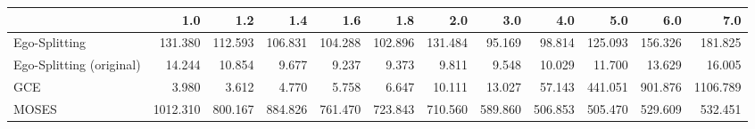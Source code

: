 \begin{tabular}{lrrrrrrrrrrr}
\toprule
{} &      1.0 &     1.2 &     1.4 &     1.6 &     1.8 &     2.0 &     3.0 &     4.0 &     5.0 &     6.0 &      7.0 \\
\midrule
Ego-Splitting            &  131.380 & 112.593 & 106.831 & 104.288 & 102.896 & 131.484 &  95.169 &  98.814 & 125.093 & 156.326 &  181.825 \\
Ego-Splitting (original) &   14.244 &  10.854 &   9.677 &   9.237 &   9.373 &   9.811 &   9.548 &  10.029 &  11.700 &  13.629 &   16.005 \\
GCE                      &    3.980 &   3.612 &   4.770 &   5.758 &   6.647 &  10.111 &  13.027 &  57.143 & 441.051 & 901.876 & 1106.789 \\
MOSES                    & 1012.310 & 800.167 & 884.826 & 761.470 & 723.843 & 710.560 & 589.860 & 506.853 & 505.470 & 529.609 &  532.451 \\
\bottomrule
\end{tabular}
